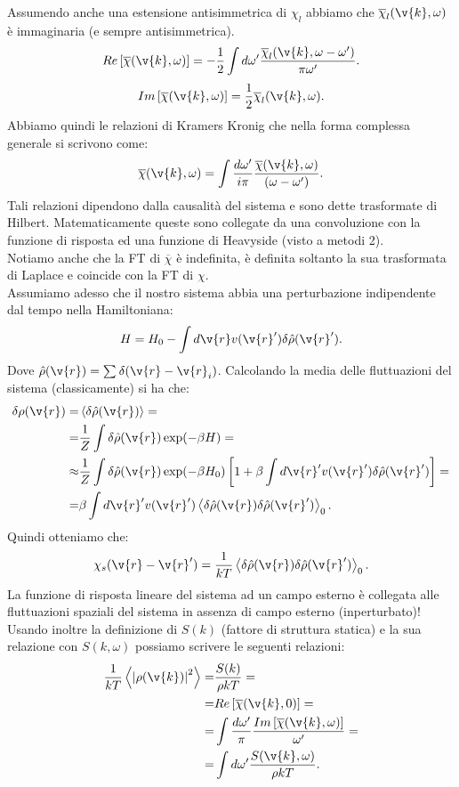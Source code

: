 Assumendo anche una estensione antisimmetrica di $\chi_l$ abbiamo che $ \overline{\chi}_l(\v{k},\omega)$ è immaginaria (e sempre antisimmetrica).
\[
    Re\left[ \overline{\chi}(\v{k},\omega)\right] =
    -\frac{1}{2}\int d\omega' 
    \frac{\overline{\chi}_l(\v{k},\omega-\omega')}{\pi\omega'}
.\] 
\[
    Im\left[ \overline{\chi}(\v{k},\omega)\right] =
    \frac{1}{2}\overline{\chi}_l(\v{k},\omega) \\
.\] 
Abbiamo quindi le relazioni di Kramers Kronig che nella forma complessa generale si scrivono come:
\[
    \overline{\chi}(\v{k},\omega) = \int \frac{d\omega'}{i\pi}
    \frac{\overline{\chi}(\v{k},\omega)}{(\omega-\omega')}
.\] 
Tali relazioni dipendono dalla causalità del sistema e sono dette trasformate di Hilbert. Matematicamente queste sono collegate da una convoluzione con la funzione di risposta ed una funzione di Heavyside (visto a metodi 2). \\
Notiamo anche che la FT di $ \overline{\chi}$ è indefinita, è definita soltanto la sua trasformata di Laplace e coincide con la FT di $\chi$.\\
Assumiamo adesso che il nostro sistema abbia una perturbazione indipendente dal tempo nella Hamiltoniana:
\[
    H= H_0 - \int d\v{r} v(\v{r}') \delta  \hat{\rho}(\v{r}') 
.\] 
Dove $ \hat{\rho}(\v{r}) = \sum_{}^{} \delta (\v{r}-\v{r}_i)$. Calcolando la media delle fluttuazioni del sistema (classicamente) si ha che:
\[\begin{aligned}
    \delta\rho (\v{r}) =& \left<\delta  \hat{\rho}(\v{r}) \right> =\\
    =&
    \frac{1}{Z}\int \delta  \hat{\rho}(\v{r}) \exp(-\beta H) = \\
    \approx &
    \frac{1}{Z}\int \delta  \hat{\rho}(\v{r}) \exp(-\beta  H_0)
    \left[1+\beta\int d\v{r}'v(\v{r}') \delta  \hat{\rho}(\v{r}')\right]=\\
    =&
    \beta\int d\v{r}'v(\v{r}')
    \left<\delta  \hat{\rho}(\v{r}) \delta\hat{\rho}(\v{r}') \right>_0
.\end{aligned}\]
Quindi otteniamo che:
\[
    \chi_s(\v{r}-\v{r}') 
    = \frac{1}{kT}\left<\delta\hat{\rho}(\v{r})\delta\hat{\rho}(\v{r}')\right>_0
.\] 
La funzione di risposta lineare del sistema ad un campo esterno è collegata alle fluttuazioni spaziali del sistema in assenza di campo esterno (inperturbato)!\\
Usando inoltre la definizione di $S(k)$ (fattore di struttura statica) e la sua relazione con $S(k,\omega)$ possiamo scrivere le seguenti relazioni:
\[\begin{aligned}
    \frac{1}{kT}\left<\left|\rho (\v{k}) \right|^2\right> = &
    \frac{S(k)}{\rho kT} =\\
    =&
    Re\left[\overline{\chi}(\v{k},0)\right] =\\
    =&
    \int \frac{d\omega'}{\pi} 
    \frac{Im\left[\overline{\chi}(\v{k},\omega)\right]}{\omega'} =\\
    =&
    \int d\omega' \frac{S(\v{k},\omega)}{\rho  kT}
.\end{aligned}\]

